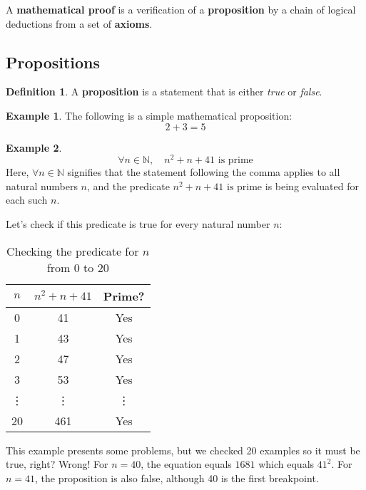\documentclass[11pt]{article}
\theoremstyle{definition}
\newtheorem{definition}{Definition}
\newtheorem{example}{Example}
\begin{document}
A \textbf{mathematical proof} is a verification of a \textbf{proposition} by a chain of logical deductions from a set of \textbf{axioms}.

\subsection{Propositions}

\begin{definition}
A \textbf{proposition} is a statement that is either \textit{true} or \textit{false}.
\end{definition}

\begin{example}
  The following is a simple mathematical proposition:
  \[
  2 + 3 = 5
  \]
\end{example}
  
\begin{example}
  \[
  \forall n \in \mathbb{N}, \quad n^2 + n + 41 \text{ is prime}
  \]
  Here, \(\forall n \in \mathbb{N}\) signifies that the statement following the comma applies to all natural numbers \( n \), and the predicate \( n^2 + n + 41 \text{ is prime}\) is being evaluated for each such \( n \).
\end{example}
  
\begin{center}
Let's check if this predicate is true for every natural number \( n \):
\begin{table}[h!]
\centering
\begin{tabular}{c c c}
\toprule
\(n\) & \(n^2 + n + 41\) & Prime? \\
\midrule
0 & 41 & Yes \\
1 & 43 & Yes \\
2 & 47 & Yes \\
3 & 53 & Yes \\
\vdots & \vdots & \vdots \\
20 & 461 & Yes \\
\bottomrule
\end{tabular}
\caption{Checking the predicate for \(n\) from 0 to 20}\label{tab:predicate_check}
\end{table}
\end{center}

This example presents some problems, but we checked 20 examples so it must be true, right? Wrong! For \( n = 40 \), the equation equals \( 1681 \) which equals \( 41^2 \). For \( n = 41 \), the proposition is also false, although 40 is the first breakpoint.
\end{document}
